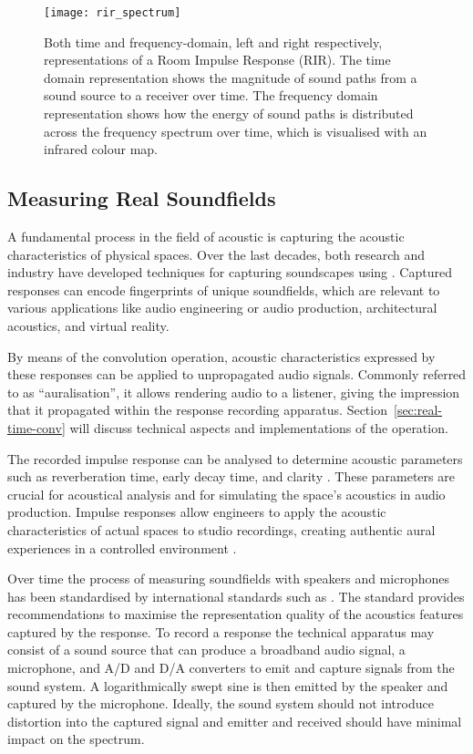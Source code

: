 \begin{figure}
    \centering
    \texttt{[image: rir\_spectrum]}
    \caption[Time and frequency-domain visualisation of a RIR]{Both time and frequency-domain, left and right respectively, representations of a Room Impulse Response (RIR). The time domain representation shows the magnitude of sound paths from a sound source to a receiver over time. The frequency domain representation shows how the energy of sound paths is distributed across the frequency spectrum over time, which is visualised with an infrared colour map.}
    \label{fig:rir-spectrum}
\end{figure}

\subsection{Measuring Real Soundfields}
A fundamental process in the field of acoustic is capturing the acoustic characteristics of physical spaces. Over the last decades, both research and industry have developed techniques for capturing soundscapes using . Captured responses can encode fingerprints of unique soundfields, which are relevant to various applications like audio engineering or audio production, architectural acoustics, and virtual reality.\par
By means of the convolution operation, acoustic characteristics expressed by these responses can be applied to unpropagated audio signals. Commonly referred to as ``auralisation'', it allows rendering audio to a listener, giving the impression that it propagated within the response recording apparatus. Section~\ref{sec:real-time-conv} will discuss technical aspects and implementations of the operation.\par
The recorded impulse response can be analysed to determine acoustic parameters such as reverberation time, early decay time, and clarity \citep{farina07}. These parameters are crucial for acoustical analysis and for simulating the space's acoustics in audio production. Impulse responses allow engineers to apply the acoustic characteristics of actual spaces to studio recordings, creating authentic aural experiences in a controlled environment \citep{lima_RIR_Parameters}.\par
Over time the process of measuring soundfields with speakers and microphones has been standardised by international standards such as \citep{liebetrau2014revision}. The standard provides recommendations to maximise the representation quality of the acoustics features captured by the response. To record a response the technical apparatus may consist of a sound source that can produce a broadband audio signal, a microphone, and A/D and D/A converters to emit and capture signals from the sound system. A logarithmically swept sine is then emitted by the speaker and captured by the microphone. Ideally, the sound system should not introduce distortion into the captured signal and emitter and received should have minimal impact on the spectrum. \par
